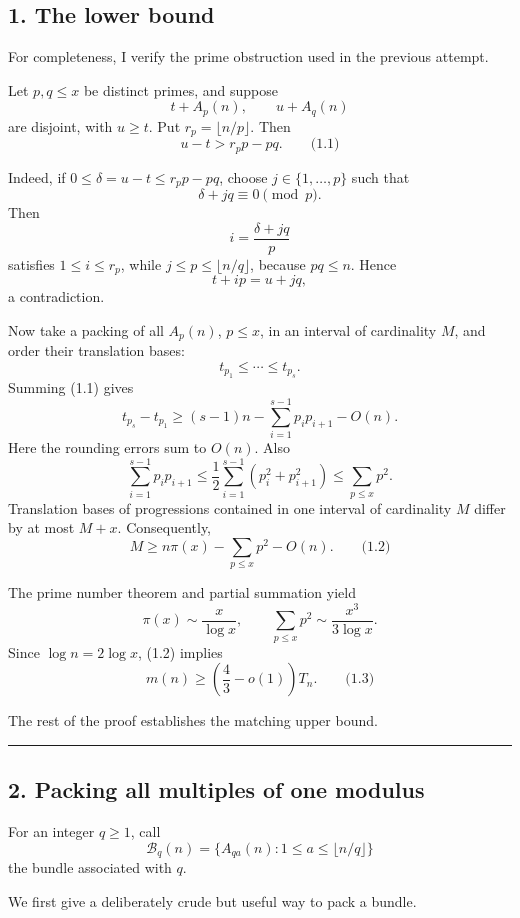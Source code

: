 \documentclass[
  11pt,
  a4paper,
]{article}
\begin{document}
\subsection{1. The lower bound}\label{the-lower-bound}

For completeness, I verify the prime obstruction used in the previous
attempt.

Let \(p,q\le x\) be distinct primes, and suppose \[
t+A_p(n),\qquad u+A_q(n)
\] are disjoint, with \(u\ge t\). Put \(r_p=\lfloor n/p\rfloor\). Then
\[
u-t>r_pp-pq.
\qquad\text{(1.1)}
\]

Indeed, if \(0\le \delta=u-t\le r_pp-pq\), choose \(j\in\{1,\ldots,p\}\)
such that \[
\delta+jq\equiv0\pmod p.
\] Then \[
i=\frac{\delta+jq}{p}
\] satisfies \(1\le i\le r_p\), while \(j\le p\le\lfloor n/q\rfloor\),
because \(pq\le n\). Hence \[
t+ip=u+jq,
\] a contradiction.

Now take a packing of all \(A_p(n)\), \(p\le x\), in an interval of
cardinality \(M\), and order their translation bases: \[
t_{p_1}\le\cdots\le t_{p_s}.
\] Summing (1.1) gives \[
t_{p_s}-t_{p_1}
\ge (s-1)n-\sum_{i=1}^{s-1}p_ip_{i+1}-O(n).
\] Here the rounding errors sum to \(O(n)\). Also \[
\sum_{i=1}^{s-1}p_ip_{i+1}
\le \frac12\sum_{i=1}^{s-1}(p_i^2+p_{i+1}^2)
\le\sum_{p\le x}p^2.
\] Translation bases of progressions contained in one interval of
cardinality \(M\) differ by at most \(M+x\). Consequently, \[
M\ge n\pi(x)-\sum_{p\le x}p^2-O(n).
\qquad\text{(1.2)}
\]

The prime number theorem and partial summation yield \[
\pi(x)\sim\frac{x}{\log x},
\qquad
\sum_{p\le x}p^2\sim\frac{x^3}{3\log x}.
\] Since \(\log n=2\log x\), (1.2) implies \[
m(n)\ge\left(\frac43-o(1)\right)T_n.
\qquad\text{(1.3)}
\]

The rest of the proof establishes the matching upper bound.

\begin{center}\rule{0.5\linewidth}{0.5pt}\end{center}

\subsection{2. Packing all multiples of one
modulus}\label{packing-all-multiples-of-one-modulus}

For an integer \(q\ge1\), call \[
\mathcal B_q(n)=\{A_{qa}(n):1\le a\le \lfloor n/q\rfloor\}
\] the bundle associated with \(q\).

We first give a deliberately crude but useful way to pack a bundle.
\end{document}

